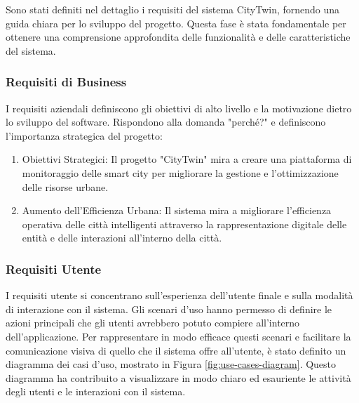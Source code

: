Sono stati definiti nel dettaglio i requisiti del sistema CityTwin, fornendo una guida chiara per lo sviluppo del progetto. Questa fase è stata fondamentale per ottenere una comprensione approfondita delle funzionalità e delle caratteristiche del sistema.

\subsubsection{Requisiti di Business}
I requisiti aziendali definiscono gli obiettivi di alto livello e la motivazione dietro lo sviluppo del software. Rispondono alla domanda "perché?" e definiscono l'importanza strategica del progetto:
\begin{enumerate}
    \item Obiettivi Strategici: Il progetto "CityTwin" mira a creare una piattaforma di monitoraggio delle smart city per migliorare la gestione e l'ottimizzazione delle risorse urbane.
    \item Aumento dell'Efficienza Urbana: Il sistema mira a migliorare l'efficienza operativa delle città intelligenti attraverso la rappresentazione digitale delle entità e delle interazioni all'interno della città.
\end{enumerate}

\subsubsection{Requisiti Utente}
I requisiti utente si concentrano sull'esperienza dell'utente finale e sulla modalità di interazione con il sistema.
Gli scenari d'uso hanno permesso di definire le azioni principali che gli utenti avrebbero potuto compiere all'interno dell'applicazione.
Per rappresentare in modo efficace questi scenari e facilitare la comunicazione visiva di quello che il sistema offre all'utente, è stato definito un diagramma dei casi d'uso, mostrato in Figura \ref{fig:use-cases-diagram}. Questo diagramma ha contribuito a visualizzare in modo chiaro ed esauriente le attività degli utenti e le interazioni con il sistema.


